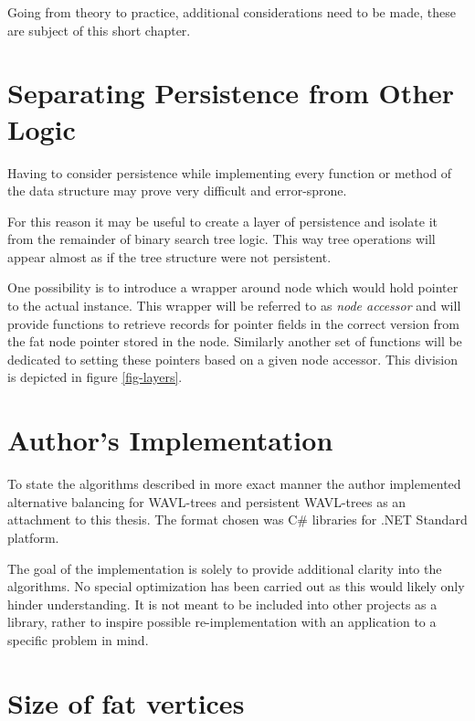 Going from theory to practice, additional considerations need to be made, these are subject of this short chapter.

\section{Separating Persistence from Other Logic}

Having to consider persistence while implementing every function or method of the data structure may prove very difficult and error-sprone.

For this reason it may be useful to create a layer of persistence and isolate it from the remainder of binary search tree logic. This way tree operations will appear almost as if the tree structure were not persistent.

One possibility is to introduce a wrapper around node which would hold pointer to the actual instance. This wrapper will be referred to as \emph{node accessor} and will provide functions to retrieve records for pointer fields in the correct version from the fat node pointer stored in the node. Similarly another set of functions will be dedicated to setting these pointers based on a given node accessor.
This division is depicted in figure \ref{fig-layers}.



\section{Author's Implementation}

To state the algorithms described in more exact manner the author implemented alternative balancing for WAVL-trees and persistent WAVL-trees as an attachment to this thesis. The format chosen was C\# libraries for .NET Standard platform.


The goal of the implementation is solely to provide additional clarity into the algorithms. No special optimization has been carried out as this would likely only hinder understanding. It is not meant to be included into other projects as a library, rather to inspire possible re-implementation with an application to a specific problem in mind.

\section{Size of fat vertices}

